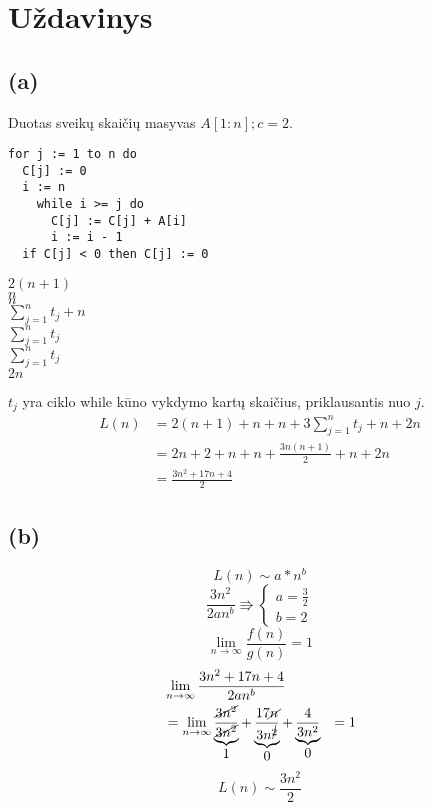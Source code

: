 \documentclass[a4paper,lithuanian]{article}
\begin{document}
\section{Uždavinys}
\subsection*{(a)}
Duotas sveikų skaičių masyvas $A[1 : n]; c = 2$.
\begin{multicols}{2}
  \begin{lstlisting}
for j := 1 to n do
  C[j] := 0
  i := n
    while i >= j do
      C[j] := C[j] + A[i]
      i := i - 1
  if C[j] < 0 then C[j] := 0
  \end{lstlisting}
  \columnbreak
  $2(n+1)$\\
  $n$\\
  $n$\\
  $\sum_{j=1}^{n}t_j + n$\\
  $\sum_{j=1}^{n}t_j$\\
  $\sum_{j=1}^{n}t_j$\\
  $2n$\\
\end{multicols}
$t_j$ yra ciklo while kūno vykdymo kartų skaičius, priklausantis nuo $j$.
\begin{equation}
  \begin{aligned}
    L(n)&=2(n+1)+n+n+3\sum_{j=1}^{n}t_j+n+2n\\
        &=2n + 2 + n + n  + \frac{3n(n+1)}{2} + n + 2n\\
        &=\frac{3n^2+17n+4}{2}
  \end{aligned}
\end{equation}
\subsection*{(b)}
\begin{equation}
L(n)\sim{}a*n^b
\end{equation}
\begin{equation}
  \frac{3n^2}{2an^b} \Rrightarrow{} \begin{cases} a = \frac{3}{2} \\ b = 2  \end{cases}
\end{equation}
\begin{equation}
  \lim_{n\rightarrow\infty{}}\frac{f(n)}{g(n)}=1
\end{equation}
\begin{equation}
  \begin{aligned}
  & \lim_{n\rightarrow\infty{}}\frac{3n^2+17n+4}{2an^b} \\
  &= \lim_{n\rightarrow\infty{}}\underbrace{\frac{\cancel{3n^2}}{\cancel{3n^2}}}_{\hbox{1}} + \underbrace{\frac{17\cancel{n}}{3n^{\cancel{2}}}}_{\hbox{0}} + \underbrace{\frac{4}{3n^2}}_{\hbox{0}} 
  &= 1
  \end{aligned}
\end{equation}
\begin{equation}
L(n)\sim{}\frac{3n^2}{2}
\end{equation}
\end{document}
